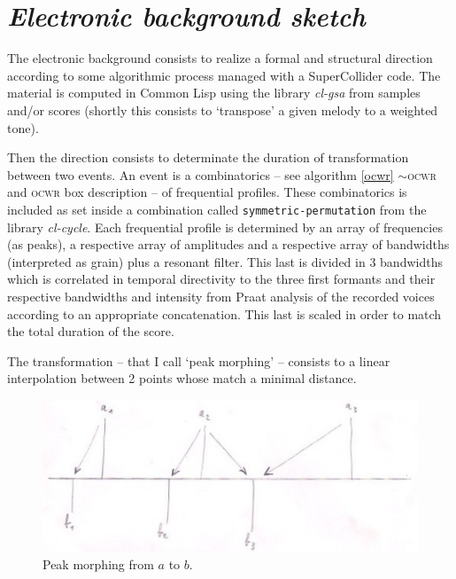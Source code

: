 \clearpage

\section{\textsl{Electronic background sketch}}

\label{imp1}

\bigskip

The electronic background consists to realize a formal and structural direction according to some algorithmic process managed with a SuperCollider code. The material is computed in Common Lisp using the library \textsl{cl-gsa} from samples and/or scores (shortly this consists to `transpose' a given melody to a weighted tone).

Then the direction consists to determinate the duration of transformation between two events. An event is a combinatorics %
 -- see  algorithm \ref{ocwr} $\sim$\textsc{ocwr} and \textsc{ocwr} box description -- of frequential profiles. These combinatorics is included as set inside a combination called \texttt{symmetric-permutation} from the library \textsl{cl-cycle}. Each frequential profile is determined by an array of frequencies (as peaks), a respective array of amplitudes and a respective array of bandwidths (interpreted as grain) plus a resonant filter. This last is divided in 3 bandwidths which is correlated in temporal directivity to the three first formants and their respective bandwidths and intensity from Praat analysis of the recorded voices according to an appropriate concatenation. This last is scaled in order to match the total duration of the score.

\bigskip

The transformation --  that I call `peak morphing' -- consists to a linear interpolation between 2 points whose match a minimal distance.

\begin{figure}[h]
\begin{center}
\includegraphics[scale=0.6]{img/9873}
\caption{Peak morphing from $a$ to $b$.}
\label{a1}
\end{center}
\end{figure}

